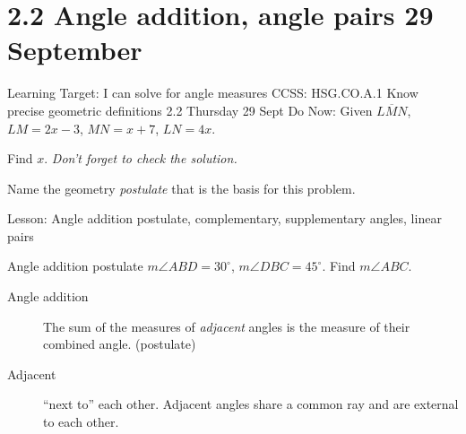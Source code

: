 \section{2.2 Angle addition, angle pairs \hfill 29 September}
\begin{frame}{Learning Target: I can solve for angle measures}
  {CCSS: HSG.CO.A.1 Know precise geometric definitions \hfill \alert{2.2 Thursday 29 Sept}}
    Do Now: Given $\overline{LMN}$, $LM=2x-3$, $MN=x+7$, $LN=4x$. \par  
    Find $x$. \emph{Don't forget to check the solution.} \medskip 
      \begin{flushleft}
      \end{flushleft}
      \vspace{2cm}
    Name the geometry \emph{postulate} that is the basis for this problem. \par \medskip 
    Lesson: Angle addition postulate, complementary, supplementary angles, linear pairs
  \end{frame}

\begin{frame}{Angle addition postulate}
  $m\angle ABD=30^\circ$, $m\angle DBC=45^\circ$. Find $m\angle ABC$. \par \bigskip
     \vspace{1cm}
    \begin{description}
      \item[Angle addition] The sum of the measures of \emph{adjacent} angles is the measure of their combined angle. (postulate)
      \item[Adjacent] ``next to'' each other. Adjacent angles share a common ray and are external to each other.
    \end{description}
  \end{frame}

